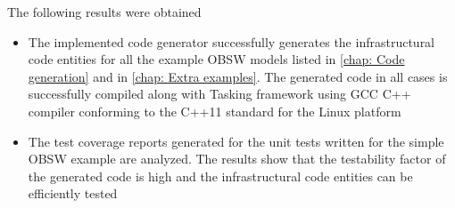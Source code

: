 The following results were obtained 
\begin{itemize}
\item  The implemented code generator successfully generates the infrastructural code entities for all the example OBSW models listed in \cref{chap: Code generation} and in \cref{chap: Extra examples}. The generated code in all cases is successfully compiled along with Tasking framework using GCC C++ compiler conforming to the C++11 standard for the Linux platform
\item The test coverage reports generated for the unit tests written for the simple OBSW example are analyzed. The results show that the testability factor of the generated code is high and the infrastructural code entities can be efficiently tested      
\end{itemize}

